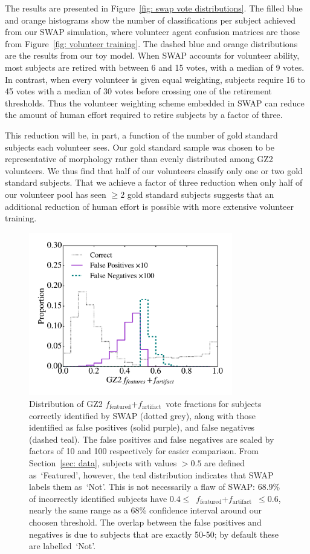 \documentclass[twocolumn,  trackchanges, ]{aastex6}%
\newcommand{\feat}{`Featured'}
\newcommand{\notfeat}{`Not'}
\newcommand{\ffeat}{$f_{\mathrm{featured}}$}
\newcommand{\fstar}{$f_{\mathrm{artifact}}$}
\begin{document}
The results are presented in Figure~\ref{fig: swap vote distributions}. The filled blue and orange histograms show the number of classifications per subject achieved from our SWAP simulation, where volunteer agent confusion matrices are those from Figure~\ref{fig: volunteer training}. The dashed blue and orange distributions are the results from our toy model. When SWAP accounts for volunteer ability, most subjects are retired with between 6 and 15 votes, with a median of 9 votes. In contrast, when every volunteer is given equal weighting, subjects require 16 to 45 votes with a median of 30 votes before crossing one of the retirement thresholds. Thus the volunteer weighting scheme embedded in SWAP can reduce the amount of human effort required to retire subjects by a factor of three.

This reduction will be, in part, a function of the number of gold standard subjects each volunteer sees.  Our gold standard sample was chosen to be representative of morphology rather than evenly distributed among GZ2 volunteers. We thus find that half of our volunteers classify only one or two gold standard subjects. That we achieve a factor of three reduction when only half of our volunteer pool has seen $\ge 2$ gold standard subjects suggests that an additional reduction of  human effort is possible with more extensive volunteer training.

\begin{figure}[t!]
\includegraphics[width=3.5in]{f8.pdf}
\caption{Distribution of GZ2 \ffeat+\fstar~vote fractions for subjects correctly identified by SWAP (dotted grey), along with those identified as false positives (solid purple), and false negatives (dashed teal). The false positives and false negatives are scaled by factors of 10 and 100 respectively for easier comparison. From Section~\ref{sec: data}, subjects with values $> 0.5$ are defined as~\feat, however, the teal distribution indicates that SWAP labels them as~\notfeat. This is not necessarily a flaw of SWAP: 68.9\% of incorrectly identified subjects have $0.4 \le $~\ffeat +\fstar~$ \le 0.6$, nearly the same range as a 68\% confidence interval around our choosen threshold.  The overlap between the false positives and negatives is due to subjects that are exactly 50-50; by default these are labelled~\notfeat. \label{fig: SWAP sucks}}
\end{figure}
\end{document}
